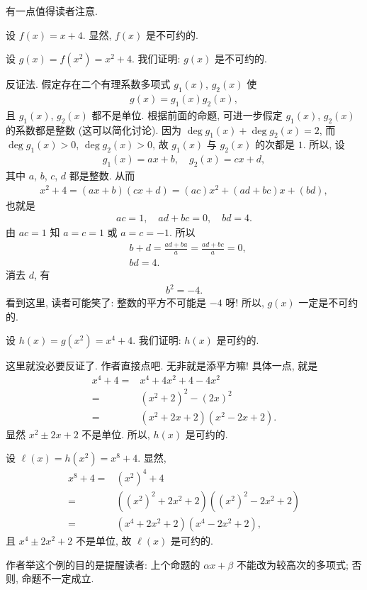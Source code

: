 \begin{remark}
    有一点值得读者注意.

    设 $f(x) = x + 4$. 显然, $f(x)$ 是不可约的.

    设 $g(x) = f(x^2) = x^2 + 4$. 我们证明: $g(x)$ 是不可约的.

    反证法. 假定存在二个有理系数多项式 $g_1 (x)$, $g_2 (x)$ 使
    \begin{align*}
        g(x) = g_1 (x) g_2 (x),
    \end{align*}
    且 $g_1 (x)$, $g_2 (x)$ 都不是单位. 根据前面的命题, 可进一步假定 $g_1 (x)$, $g_2 (x)$ 的系数都是整数 (这可以简化讨论). 因为 $\deg g_1 (x) + \deg g_2 (x) = 2$, 而 $\deg g_1 (x) > 0$, $\deg g_2 (x) > 0$, 故 $g_1 (x)$ 与 $g_2 (x)$ 的次都是 $1$. 所以, 设
    \begin{align*}
        g_1 (x) = ax + b, \quad g_2 (x) = cx + d,
    \end{align*}
    其中 $a$, $b$, $c$, $d$ 都是整数. 从而
    \begin{align*}
        x^2 + 4 = (ax + b)(cx + d) = (ac) x^2 + (ad + bc) x + (bd),
    \end{align*}
    也就是
    \begin{align*}
        ac = 1, \quad ad + bc = 0, \quad bd = 4.
    \end{align*}
    由 $ac = 1$ 知 $a = c = 1$ 或 $a = c = -1$. 所以
    \begin{align*}
         & b + d = \frac{ad + ba}{a} = \frac{ad + bc}{a} = 0, \\
         & bd = 4.
    \end{align*}
    消去 $d$, 有
    \begin{align*}
        b^2 = -4.
    \end{align*}
    看到这里, 读者可能笑了: 整数的平方不可能是 $-4$ 呀! 所以, $g(x)$ 一定是不可约的.

    设 $h(x) = g(x^2) = x^4 + 4$. 我们证明: $h(x)$ 是可约的.

    这里就没必要反证了. 作者直接点吧. 无非就是添平方嘛! 具体一点, 就是
    \begin{align*}
        x^4 + 4
        = {} & x^4 + 4x^2 + 4 - 4x^2          \\
        = {} & (x^2 + 2)^2 - (2x)^2           \\
        = {} & (x^2 + 2x + 2) (x^2 - 2x + 2).
    \end{align*}
    显然 $x^2 \pm 2x + 2$ 不是单位. 所以, $h(x)$ 是可约的.

    设 $\ell (x) = h(x^2) = x^8 + 4$. 显然,
    \begin{align*}
        x^8 + 4
        = {} & (x^2)^4 + 4                               \\
        = {} & ((x^2)^2 + 2x^2 + 2) ((x^2)^2 - 2x^2 + 2) \\
        = {} & (x^4 + 2x^2 + 2) (x^4 - 2x^2 + 2),
    \end{align*}
    且 $x^4 \pm 2x^2 + 2$ 不是单位, 故 $\ell (x)$ 是可约的.

    作者举这个例的目的是提醒读者: 上个命题的 $\alpha x + \beta$ 不能改为较高次的多项式; 否则, 命题不一定成立.
\end{remark}

